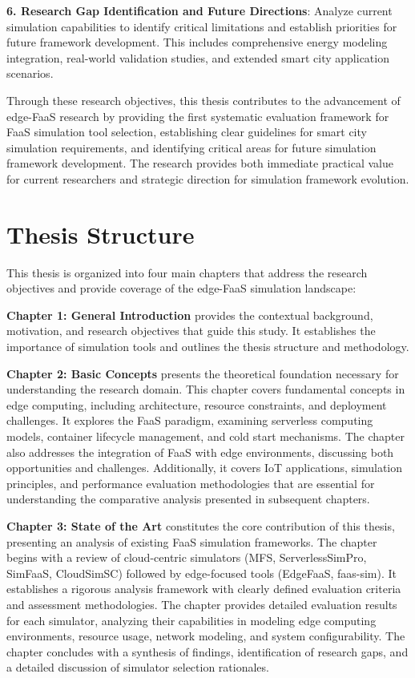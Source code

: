 \textbf{6. Research Gap Identification and Future Directions}: Analyze current simulation capabilities to identify critical limitations and establish priorities for future framework development. This includes comprehensive energy modeling integration, real-world validation studies, and extended smart city application scenarios.

Through these research objectives, this thesis contributes to the advancement of edge-FaaS research by providing the first systematic evaluation framework for FaaS simulation tool selection, establishing clear guidelines for smart city simulation requirements, and identifying critical areas for future simulation framework development. The research provides both immediate practical value for current researchers and strategic direction for simulation framework evolution.

\section{Thesis Structure}

This thesis is organized into four main chapters that address the research objectives and provide coverage of the edge-FaaS simulation landscape:

\textbf{Chapter 1: General Introduction} provides the contextual background, motivation, and research objectives that guide this study. It establishes the importance of simulation tools and outlines the thesis structure and methodology.

\textbf{Chapter 2: Basic Concepts} presents the theoretical foundation necessary for understanding the research domain. This chapter covers fundamental concepts in edge computing, including architecture, resource constraints, and deployment challenges. It explores the FaaS paradigm, examining serverless computing models, container lifecycle management, and cold start mechanisms. The chapter also addresses the integration of FaaS with edge environments, discussing both opportunities and challenges. Additionally, it covers IoT applications, simulation principles, and performance evaluation methodologies that are essential for understanding the comparative analysis presented in subsequent chapters.

\textbf{Chapter 3: State of the Art} constitutes the core contribution of this thesis, presenting an analysis of existing FaaS simulation frameworks. The chapter begins with a review of cloud-centric simulators (MFS, ServerlessSimPro, SimFaaS, CloudSimSC) followed by edge-focused tools (EdgeFaaS, faas-sim). It establishes a rigorous analysis framework with clearly defined evaluation criteria and assessment methodologies. The chapter provides detailed evaluation results for each simulator, analyzing their capabilities in modeling edge computing environments, resource usage, network modeling, and system configurability. The chapter concludes with a synthesis of findings, identification of research gaps, and a detailed discussion of simulator selection rationales.

